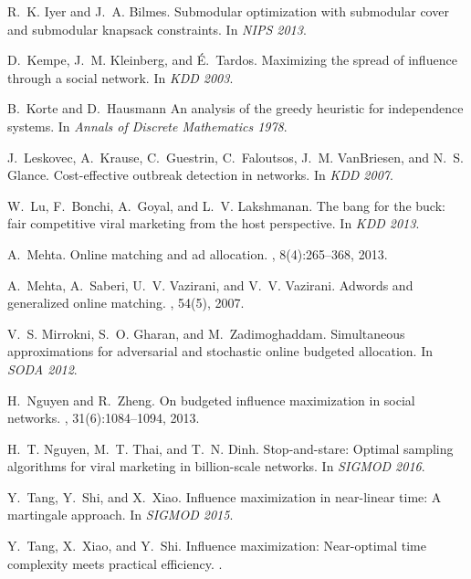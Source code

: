 \begin{thebibliography}{10}
\begin{scriptsize}
R.~K. Iyer and J.~A. Bilmes.
\newblock Submodular optimization with submodular cover and submodular knapsack
  constraints.
\newblock In {\em NIPS 2013}.

D.~Kempe, J.~M. Kleinberg, and {\'E}.~Tardos.
\newblock Maximizing the spread of influence through a social network.
\newblock In {\em KDD 2003}.

B.~Korte and D.~Hausmann
\newblock An analysis of the greedy heuristic for independence systems.
\newblock In {\em Annals of Discrete Mathematics 1978}.

J.~Leskovec, A.~Krause, C.~Guestrin, C.~Faloutsos, J.~M. VanBriesen, and N.~S.
  Glance.
\newblock Cost-effective outbreak detection in networks.
\newblock In {\em KDD 2007}.

W.~Lu, F.~Bonchi, A.~Goyal, and L.~V. Lakshmanan.
\newblock The bang for the buck: fair competitive viral marketing from the host
  perspective.
\newblock In {\em KDD 2013}.

\enlargethispage{\baselineskip}

A.~Mehta.
\newblock Online matching and ad allocation.
,
  8(4):265--368, 2013.

A.~Mehta, A.~Saberi, U.~V. Vazirani, and V.~V. Vazirani.
\newblock Adwords and generalized online matching.
, 54(5), 2007.

V.~S. Mirrokni, S.~O. Gharan, and M.~Zadimoghaddam.
\newblock Simultaneous approximations for adversarial and stochastic online
  budgeted allocation.
\newblock In {\em SODA 2012}.

H.~Nguyen and R.~Zheng.
\newblock On budgeted influence maximization in social networks.
,
  31(6):1084--1094, 2013.

H.~T. Nguyen, M.~T. Thai, and T.~N. Dinh.
\newblock Stop-and-stare: Optimal sampling algorithms for viral marketing in
  billion-scale networks.
\newblock In {\em SIGMOD 2016}.

Y.~Tang, Y.~Shi, and X.~Xiao.
\newblock Influence maximization in near-linear time: A martingale approach.
\newblock In {\em SIGMOD 2015}.

Y.~Tang, X.~Xiao, and Y.~Shi.
\newblock Influence maximization: Near-optimal time complexity meets practical
  efficiency.
.


\end{scriptsize}
\end{thebibliography}
